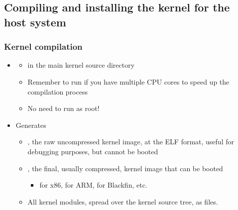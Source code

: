\subsection[Installation on the host]{Compiling and installing the
  kernel for the host system}

\begin{frame}
  \frametitle{Kernel compilation}
  \begin{itemize}
  \item {}
    \begin{itemize}
    \item in the main kernel source directory
    \item Remember to run  if you have multiple CPU
      cores to speed up the compilation process
    \item No need to run as root!
    \end{itemize}
  \item Generates
    \begin{itemize}
    \item {}, the raw uncompressed kernel image, at the
      ELF format, useful for debugging purposes, but cannot be booted
    \item {}, the final, usually
      compressed, kernel image that can be booted
      \begin{itemize}
      \item {} for x86,  for ARM,
         for Blackfin, etc.
      \end{itemize}
    \item All kernel modules, spread over the kernel source tree, as
       files.
    \end{itemize}
  \end{itemize}
\end{frame}

